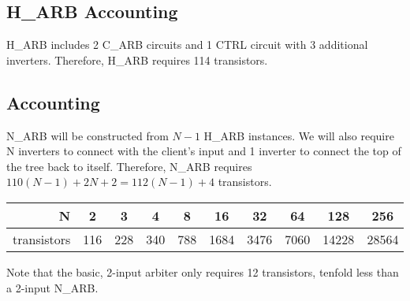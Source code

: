 \documentclass[aer.tex]{subfiles}
\begin{document}
\subsection{H\_ARB Accounting}

H\_ARB includes 2 C\_ARB circuits and 1 CTRL circuit with 3 additional inverters. Therefore, H\_ARB requires 114 transistors.

\subsection{Accounting}

N\_ARB will be constructed from $N-1$ H\_ARB instances. We will also require N inverters to connect with the client's input and 1 inverter to connect the top of the tree back to itself. Therefore, N\_ARB requires $110(N-1)+2N+2=112(N-1)+4$ transistors.

\begin{center}
  \begin{tabular}{|r|c|c|c|c|c|c|c|c|c|}
    \hline
    N & 2 & 3 & 4 & 8 & 16 & 32 & 64 & 128 & 256 \\
    \hline
    transistors & 116 & 228 & 340 & 788 & 1684 & 3476 & 7060 & 14228 & 28564 \\
    \hline
  \end{tabular}
\end{center}

Note that the basic, 2-input arbiter only requires 12 transistors, tenfold less than a 2-input N\_ARB.

\end{document}

